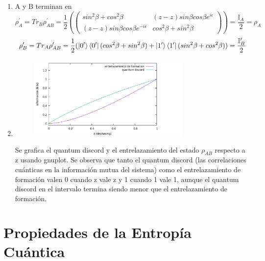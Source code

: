 \documentclass{book}
\begin{document}
\begin{enumerate}
    \item A y B terminan en
    $$\rho_A^\prime=Tr_B\rho_{AB}^\prime=\frac{1}{2}(\begin{pmatrix}sin^2\beta+cos^2\beta&(z-z)sin\beta cos\beta e^{i\epsilon}\\(z-z)sin\beta cos\beta e^{-i\epsilon}&cos^2\beta+sin^2\beta\end{pmatrix})=\frac{\mathbb{I}_A}{2}=\rho_A$$ $$\rho_B^\prime=Tr_A\rho_{AB}^\prime=\frac{1}{2}(\ket{0^\prime}\bra{0^\prime}(cos^2\beta+sin^2\beta)+\ket{1^\prime}\bra{1^\prime}(sin^2\beta+cos^2\beta))=\frac{\mathbb{I}_B^\prime}{2}$$ 
    \item   \begin{figure}[ht][h]
    \includegraphics[width=8cm]{tarea.png} 
    \end{figure} Se grafica el quantum discord y el entrelazamiento del estado $\rho_{AB}$ respecto a z usando gnuplot. Se observa que tanto el quantum discord (las correlaciones cuánticas en la información mutua del sistema) como el entrelazamiento de formación valen 0 cuando z vale z y 1 cuando 1 vale 1, aunque el quantum discord en el intervalo termina siendo menor que el entrelazamiento de formación.
\end{enumerate}

\section{{Propiedades de la Entropía Cuántica}}
\end{document}
